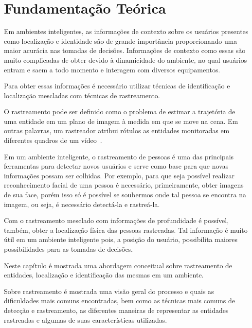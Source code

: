 \chapter{Fundamentação Teórica}


	Em ambientes inteligentes, as informações de contexto sobre os usuários presentes como localização e identidade são de grande importância proporcionando uma maior acurácia nas tomadas de decisões. Informações de contexto como essas são muito complicadas de obter devido à dinamicidade do ambiente, no qual usuários entram e saem a todo momento e interagem com diversos equipamentos.

	Para obter essas informações é necessário utilizar técnicas de identificação e localização mescladas com técnicas de rastreamento.

	O rastreamento pode ser definido como o problema de estimar a trajetória de uma entidade em um plano de imagem à medida em que se move na cena. Em outras palavras, um rastreador atribui rótulos as entidades monitoradas em diferentes quadros de um vídeo~\cite{yilmaz}.

	Em um ambiente inteligente, o rastreamento de pessoas é uma das principais ferramentas para detectar novos usuários e serve como base para que novas informações possam ser colhidas. Por exemplo, para que seja possível realizar reconhecimento facial de uma pessoa é necessário, primeiramente, obter imagens de sua face, porém isso só é possível se soubermos onde tal pessoa se encontra na imagem, ou seja, é necessário detectá-la e rastreá-la.

	Com o rastreamento mesclado com informações de profundidade é possível, também, obter a localização física das pessoas rastreadas. Tal informação é muito útil em um ambiente inteligente pois, a posição do usuário, possibilita maiores possibilidades para as tomadas de decisões.

	Neste capítulo é mostrada uma abordagem conceitual sobre rastreamento de entidades, localização e identificação das mesmas em um ambiente. 

	Sobre rastreamento é mostrada uma visão geral do processo e quais as dificuldades mais comuns encontradas, bem como as técnicas mais comuns de detecção e rastreamento, as diferentes maneiras de representar as entidades rastreadas e algumas de suas características utilizadas. 

